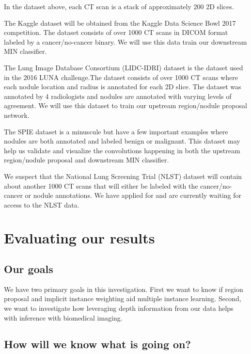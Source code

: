 \documentclass[twocolumn,10pt]{article}
\newcommand{\red}[1]{{\color{red}#1}}
\newcommand{\temp}[1]{{\red{#1}\\}}
\begin{document}
In the dataset above, each CT scan is a stack of 
approximately 200 2D slices.

The Kaggle dataset will be obtained from the Kaggle Data Science Bowl 2017
competition. The dataset consists of over 1000 CT scans in DICOM format labeled
by a cancer/no-cancer binary. We will use this data train our downstream
 MIN classifier.

The Lung Image Database Consortium (LIDC-IDRI) dataset is the dataset used in 
the 2016 LUNA challenge.The dataset consists of over 1000 CT scans where
each nodule location and radius is annotated for each 2D slice. The dataset was
annotated by 4 radiologists and nodules are annotated with varying levels of 
agreement. We will use this dataset to train our upstream region/nodule 
proposal network.

The SPIE dataset is a minuscule but have a few important examples where nodules
are both annotated and labeled benign or malignant. This dataset may help us 
validate and visualize the convolutions happening in both the upstream
region/nodule proposal and downstream MIN classifier.

We suspect that the National Lung Screening Trial (NLST) dataset will contain 
about another 1000 CT scans that will either be labeled with the 
cancer/no-cancer or nodule annotations. We have applied for and are
currently waiting for access to the NLST data.

\section{Evaluating our results}

\subsection{Our goals}
We have two primary goals in this investigation. First we want to know if region
proposal and implicit instance weighting aid multiple instance learning. Second,
we want to investigate how leveraging depth information from our data helps
with inference with biomedical imaging.

\subsection{How will we know what is going on?}
\end{document}
